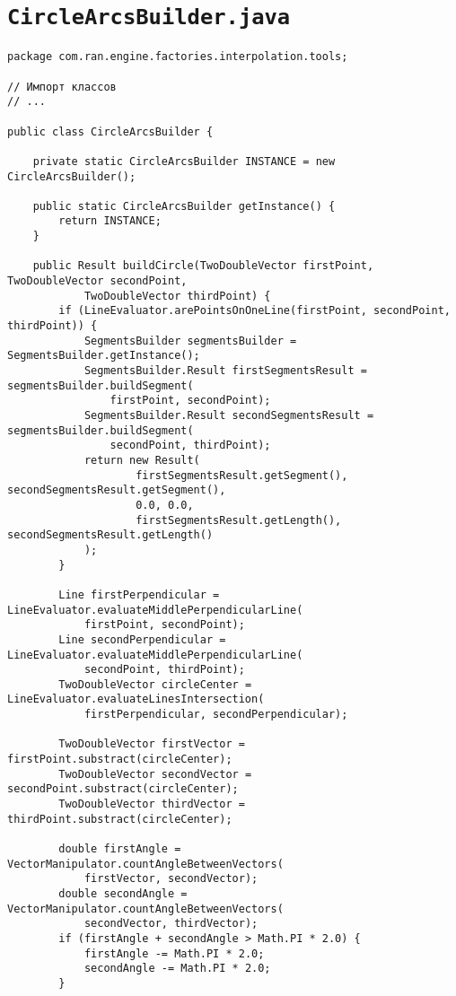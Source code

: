 \section*{\texttt{CircleArcsBuilder.java}}
\begin{verbatim}
package com.ran.engine.factories.interpolation.tools;

// Импорт классов
// ...

public class CircleArcsBuilder {

    private static CircleArcsBuilder INSTANCE = new CircleArcsBuilder();

    public static CircleArcsBuilder getInstance() {
        return INSTANCE;
    }

    public Result buildCircle(TwoDoubleVector firstPoint, TwoDoubleVector secondPoint,
            TwoDoubleVector thirdPoint) {
        if (LineEvaluator.arePointsOnOneLine(firstPoint, secondPoint, thirdPoint)) {
            SegmentsBuilder segmentsBuilder = SegmentsBuilder.getInstance();
            SegmentsBuilder.Result firstSegmentsResult = segmentsBuilder.buildSegment(
                firstPoint, secondPoint);
            SegmentsBuilder.Result secondSegmentsResult = segmentsBuilder.buildSegment(
                secondPoint, thirdPoint);
            return new Result(
                    firstSegmentsResult.getSegment(), secondSegmentsResult.getSegment(),
                    0.0, 0.0,
                    firstSegmentsResult.getLength(), secondSegmentsResult.getLength()
            );
        }

        Line firstPerpendicular = LineEvaluator.evaluateMiddlePerpendicularLine(
            firstPoint, secondPoint);
        Line secondPerpendicular = LineEvaluator.evaluateMiddlePerpendicularLine(
            secondPoint, thirdPoint);
        TwoDoubleVector circleCenter = LineEvaluator.evaluateLinesIntersection(
            firstPerpendicular, secondPerpendicular);

        TwoDoubleVector firstVector = firstPoint.substract(circleCenter);
        TwoDoubleVector secondVector = secondPoint.substract(circleCenter);
        TwoDoubleVector thirdVector = thirdPoint.substract(circleCenter);

        double firstAngle = VectorManipulator.countAngleBetweenVectors(
            firstVector, secondVector);
        double secondAngle = VectorManipulator.countAngleBetweenVectors(
            secondVector, thirdVector);
        if (firstAngle + secondAngle > Math.PI * 2.0) {
            firstAngle -= Math.PI * 2.0;
            secondAngle -= Math.PI * 2.0;
        }


\end{verbatim}
